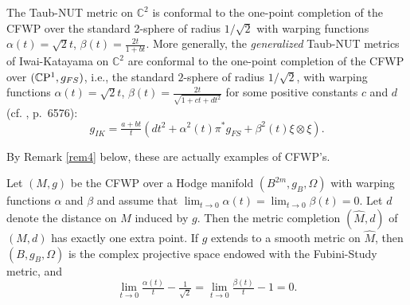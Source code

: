 \documentclass[12pt]{amsart}
\begin{document}
\begin{example}\label{ex2}
The Taub-NUT metric on ${{\mathbb C}}^2$ is conformal to the one-point completion 
of the CFWP over the standard 2-sphere 
of radius $1/\sqrt{2}$ with warping functions 
${\alpha}(t)=\sqrt{2}t$,
${\beta}(t)=\frac{2t}{1+bt}$. More generally, the {\em generalized} Taub-NUT 
metrics of Iwai-Katayama on ${{\mathbb C}}^2$ are conformal to the one-point 
completion of the CFWP over 
$({{\mathbb C}}{\rm P}^1,g_{FS})$, i.e., 
the standard $2$-sphere of radius $1/\sqrt{2}$,
with warping functions ${\alpha}(t)=\sqrt{2}t$, 
${\beta}(t)=\frac{2t}{\sqrt{1+ct+dt^2}}$ 
for some positive constants $c$ and $d$ (cf. \cite{MV}, p.\ 6576):
\begin{equation}\label{mik}
g_{IK}=\tfrac{a+bt}{t}
\left(dt^2+{\alpha}^2(t)\pi^*g_{FS}+{\beta}^2(t)\xi\otimes\xi\right).
\end{equation}
\end{example}
By Remark \ref{rem4} below, these are actually examples of CFWP's.
\begin{prop}\label{pr1}
Let $(M,g)$ be the CFWP over a Hodge manifold $(B^{2m},g_B,{\Omega})$ 
with warping functions ${\alpha}$ and ${\beta}$ and assume that 
$\displaystyle\lim_{t\to 0}{\alpha}(t)=\lim_{t\to 0}{\beta}(t)=0$. 
Let $d$ denote the distance on $M$ induced by $g$. 
Then the metric completion $(\hat M,d)$ of $(M,d)$ has exactly 
one extra point. If $g$ extends to a smooth metric on $\hat M$, 
then  $(B,g_B,{\Omega})$ is the complex projective space endowed with 
the Fubini-Study metric, and  
\[\displaystyle\lim_{t\to 0}\tfrac{{\alpha}(t)}{t}-\tfrac{1}{\sqrt 2}
=\lim_{t\to 0}\tfrac{{\beta}(t)}{t}-1=0.\]
\end{prop}
\end{document}
